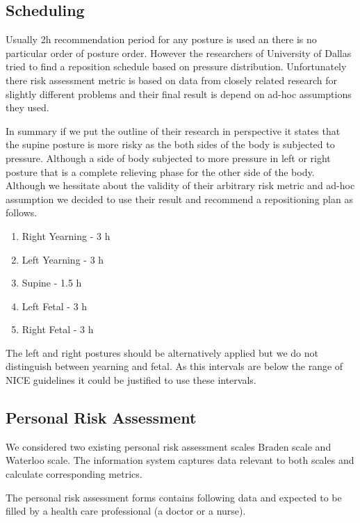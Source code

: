 \subsection{Scheduling}

Usually 2h recommendation period for any posture is used an there is no particular order of posture order. However the researchers of University of Dallas tried to find a reposition schedule based on pressure distribution. Unfortunately there risk assessment metric is based on data from closely related research for slightly different problems and their final result is depend on ad-hoc assumptions they used. 

In summary if we put the outline of their research in perspective it states that the supine posture is more risky as the both sides of the body is subjected to pressure. Although a side of body subjected to more pressure in left or right posture that is a complete relieving phase for the other side of the body. Although we hessitate about the validity of their arbitrary risk metric and ad-hoc assumption we decided to use their result and recommend a repositioning plan as follows. 

\begin{enumerate}
	\item Right Yearning - 3 h
	\item Left Yearning - 3 h
	\item Supine - 1.5 h
	\item Left Fetal - 3 h
	\item Right Fetal - 3 h
\end{enumerate}

The left and right postures should be alternatively applied but we do not distinguish between yearning and fetal. As this intervals are below the range of NICE guidelines it could be justified to use these intervals. 

\subsection{Personal Risk Assessment}

We considered two existing personal risk assessment scales Braden scale and Waterloo scale. The information system captures data relevant to both scales and calculate corresponding metrics. 

The personal risk assessment forms contains following data and expected to be filled by a health care professional (a doctor or a nurse). 

